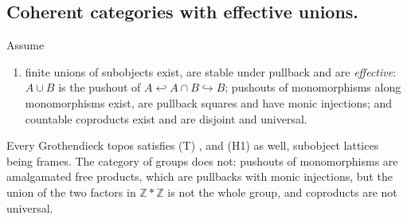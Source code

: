 \documentclass[11pt]{amsart}
\theoremstyle{definition}
\begin{document}
\subsection*{Coherent categories with effective unions.}
Assume
\begin{enumerate}
\item[(T)] finite unions of subobjects exist, are stable under pullback and
are \emph{effective}: $A\cup B$ is the pushout of $A\hookleftarrow A\cap B
\hookrightarrow B$; pushouts of monomorphisms along monomorphisms exist, are
pullback squares and have monic injections; and countable coproducts exist
and are disjoint and universal.
\end{enumerate}
Every Grothendieck topos satisfies (T) \cite[A1.4, A2.4, C2.2]{Elephant},
and (H1) as well, subobject lattices being frames. The category of groups
does not: pushouts of monomorphisms are amalgamated free products, which are
pullbacks with monic injections, but the union of the two factors in
$\mathbb Z*\mathbb Z$ is not the whole group, and coproducts are not
universal.
\end{document}
